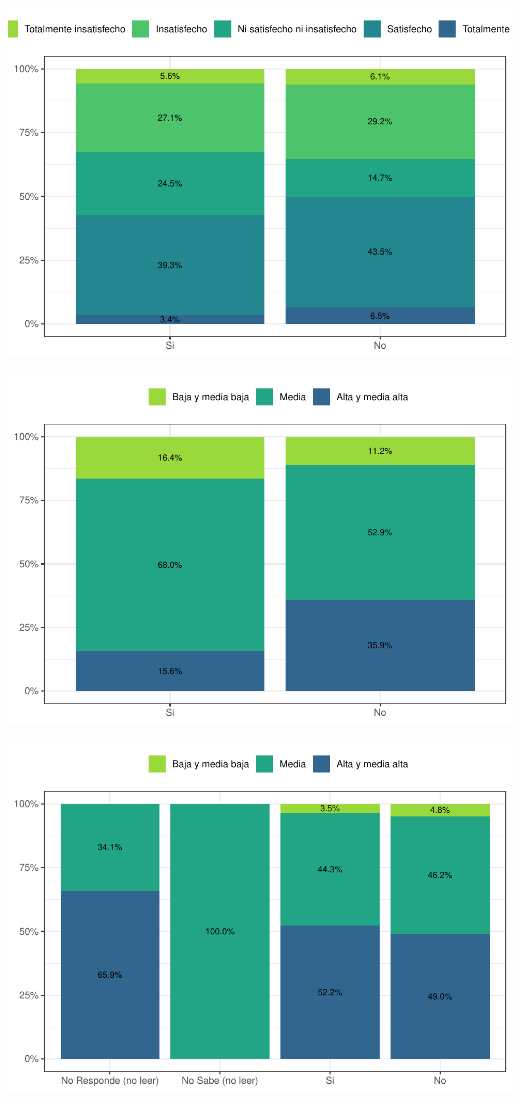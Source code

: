 \documentclass[
  12pt,
]{book}
\begin{document}
\begin{center}\includegraphics{reporte-elsoc_files/figure-latex/satisfaccion-retiro-1} \end{center}

\begin{center}\includegraphics{reporte-elsoc_files/figure-latex/clase.sub-benef.estatal-1} \end{center}

\begin{center}\includegraphics{reporte-elsoc_files/figure-latex/clase.sub.hij-1erretiro-1} \end{center}
\end{document}
